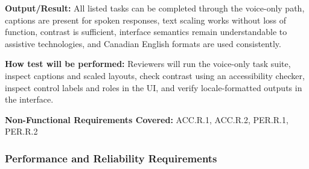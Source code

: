 \documentclass[12pt, titlepage]{article}
\begin{document}
\begin{enumerate}
\textbf{Output/Result:} All listed tasks can be completed through the
voice-only path, captions are present for spoken responses, text scaling
works without loss of function, contrast is sufficient, interface
semantics remain understandable to assistive technologies, and Canadian
English formats are used consistently.

\textbf{How test will be performed:} Reviewers will run the voice-only
task suite, inspect captions and scaled layouts, check contrast using an
accessibility checker, inspect control labels and roles in the UI, and
verify locale-formatted outputs in the interface.

\textbf{Non-Functional Requirements Covered:} ACC.R.1, ACC.R.2,
PER.R.1, PER.R.2

\end{enumerate}

\subsubsection{Performance and Reliability Requirements}
\end{document}
